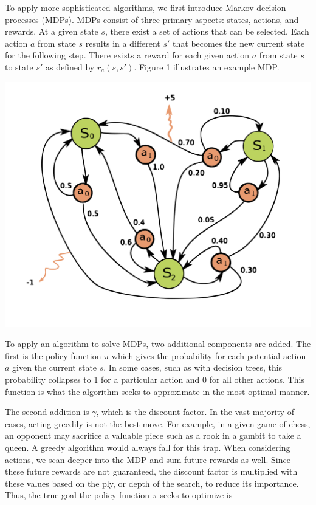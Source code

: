 \documentclass{article}
\begin{document}
To apply more sophisticated algorithms, we first introduce Markov decision processes (MDPs). MDPs consist of three primary aspects: states, actions, and rewards. At a given state $s$, there exist a set of actions that can be selected. Each action $a$ from state $s$ results in a different $s'$ that becomes the new current state for the following step. There exists a reward for each given action $a$ from state $s$ to state $s'$ as defined by $r_a(s,s')$. Figure 1 illustrates an example MDP.

\begin{center}
    \includegraphics[scale=0.2]{Markov_Decision_Process.png}
\end{center}
	
To apply an algorithm to solve MDPs, two additional components are added. The first is the policy function $\pi$ which gives the probability for each potential action $a$ given the current state $s$. In some cases, such as with decision trees, this probability collapses to 1 for a particular action and 0 for all other actions. This function is what the algorithm seeks to approximate in the most optimal manner.

The second addition is $\gamma$, which is the discount factor. In the vast majority of cases, acting greedily is not the best move. For example, in a given game of chess, an opponent may sacrifice a valuable piece such as a rook in a gambit to take a queen. A greedy algorithm would always fall for this trap. When considering actions, we scan deeper into the MDP and sum future rewards as well. Since these future rewards are not guaranteed, the discount factor is multiplied with these values based on the ply, or depth of the search, to reduce its importance. Thus, the true goal the policy function $\pi$ seeks to optimize is
\end{document}
